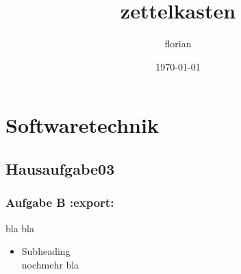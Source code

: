 \documentclass[11pt]{article}
\title{zettelkasten}
\author{florian}
\date{\today}
\begin{document}
\maketitle

\setcounter{tocdepth}{3}
\tableofcontents
\vspace*{1cm}

\section{Softwaretechnik}
\label{sec-1}
\subsection{Hausaufgabe03}
\label{sec-1-1}
\subsubsection{Aufgabe B \textbf{:export:}}
\label{sec-1-1-1}

bla bla
\begin{itemize}

\item Subheading\\
\label{sec-1-1-1-1}%
nochmehr bla

\end{itemize} %
\end{document}
